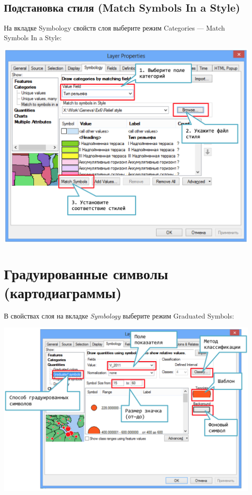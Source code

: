 \documentclass[12pt,]{book}
\begin{document}
\hypertarget{manual-vector-match}{%
\subsection{Подстановка стиля (Match Symbols In a Style)}\label{manual-vector-match}}

На вкладке Symbology свойств слоя выберите режим Categories --- Match Symbols In a Style:

\includegraphics{images/Appendix/image19.png}

\hypertarget{manual-vector-diagrams}{%
\section{Градуированные символы (картодиаграммы)}\label{manual-vector-diagrams}}

В свойствах слоя на вкладке \emph{Symbology} выберите режим Graduated Symbols:

\includegraphics{images/Appendix/image20.png}
\end{document}
